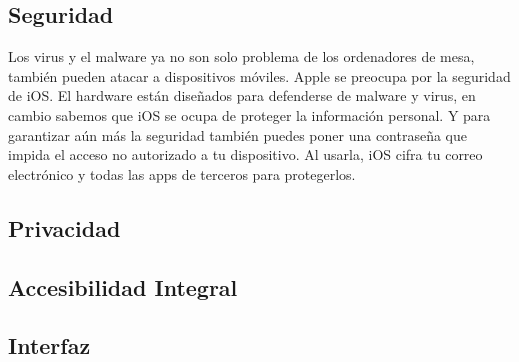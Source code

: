 \subsection*{Seguridad}
Los virus y el malware ya no son solo problema de los ordenadores de mesa, también pueden atacar a dispositivos móviles. Apple se preocupa por la seguridad de iOS. El 
hardware están diseñados para defenderse de malware y virus, en cambio sabemos que iOS se ocupa de proteger la información personal. Y para garantizar aún más la seguridad 
también puedes poner una contraseña que impida el acceso no autorizado a tu dispositivo. Al usarla, iOS cifra tu correo electrónico y todas las apps de terceros para 
protegerlos.

\subsection*{Privacidad}

\subsection*{Accesibilidad Integral}

\subsection*{Interfaz}

